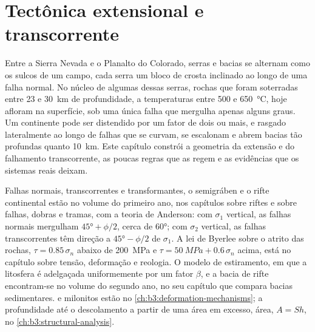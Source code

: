\chapter{Tectônica extensional e transcorrente}\label{ch:b3:extension-strike-slip}

Entre a Sierra Nevada e o Planalto do Colorado, serras e bacias
se alternam como os sulcos de um campo, cada serra um bloco de crosta inclinado
ao longo de uma falha normal. No núcleo de algumas dessas serras, rochas que
foram soterradas entre 23 e \qty{30}{km} de profundidade, a temperaturas entre 500 e \qty{650}{\celsius}, hoje afloram na
superfície, sob uma única falha que mergulha apenas alguns graus. Um continente pode
ser distendido por um fator de dois ou mais, e rasgado lateralmente ao longo de falhas
que se curvam, se escalonam e abrem bacias tão profundas quanto \qty{10}{km}. Este capítulo constrói
a geometria da extensão e do falhamento transcorrente, as poucas regras que
as regem e as evidências que os sistemas reais deixam.

\begin{recall}
Falhas normais, transcorrentes e transformantes, o semigráben e o rifte continental
estão no volume do primeiro ano, nos capítulos sobre riftes e sobre falhas, dobras
e tramas, com a teoria de Anderson: com $\sigma_1$ vertical, as falhas normais
mergulham $\ang{45} + \phi/2$, cerca de \ang{60}; com $\sigma_2$ vertical, as falhas transcorrentes
têm direção a $\ang{45} - \phi/2$ de $\sigma_1$. A lei de Byerlee sobre o atrito das rochas,
$\tau = 0.85\,\sigma_n$ abaixo de \qty{200}{MPa} e $\tau =
\qty{50}{MPa} + 0.6\,\sigma_n$ acima, está no capítulo sobre tensão, deformação e
reologia. O modelo de estiramento, em que a litosfera é adelgaçada uniformemente
por um fator $\beta$, e a bacia de rifte encontram-se no volume do segundo ano, no seu
capítulo que compara bacias sedimentares.  e milonitos estão no
\cref{ch:b3:deformation-mechanisms}; a profundidade até o descolamento a partir de uma área em excesso,
área, $A = Sh$, no \cref{ch:b3:structural-analysis}.
\end{recall}

